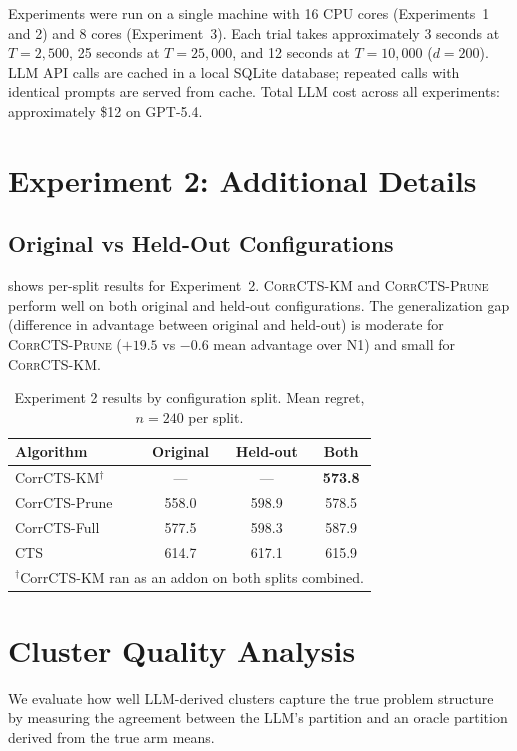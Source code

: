\documentclass{article}
\theoremstyle{plain}
\theoremstyle{definition}
\theoremstyle{remark}
\newcommand{\EdgePrune}{\textsc{CorrCTS-Prune}}
\newcommand{\KMRefine}{\textsc{CorrCTS-KM}}
\begin{document}
Experiments were run on a single machine with 16 CPU cores (Experiments~1 and 2) and 8 cores (Experiment~3).
Each trial takes approximately 3 seconds at $T = 2{,}500$, 25 seconds at $T = 25{,}000$, and 12 seconds at $T = 10{,}000$ ($d = 200$).
LLM API calls are cached in a local SQLite database; repeated calls with identical prompts are served from cache.
Total LLM cost across all experiments: approximately \$12 on GPT-5.4.

\section{Experiment 2: Additional Details}\label{app:tier7details}

\subsection{Original vs Held-Out Configurations}

 shows per-split results for Experiment~2.
\KMRefine{} and \EdgePrune{} perform well on both original and held-out configurations.
The generalization gap (difference in advantage between original and held-out) is moderate for \EdgePrune{} ($+19.5$ vs $-0.6$ mean advantage over N1) and small for \KMRefine{}.

\begin{table}[h]
\caption{Experiment 2 results by configuration split. Mean regret, $n = 240$ per split.}
\label{tab:tier7splits}
\centering
\small
\begin{tabular}{@{}lccc@{}}
\toprule
Algorithm & Original & Held-out & Both \\
\midrule
CorrCTS-KM$^\dagger$ & --- & --- & \textbf{573.8} \\
CorrCTS-Prune & 558.0 & 598.9 & 578.5 \\
CorrCTS-Full & 577.5 & 598.3 & 587.9 \\
CTS & 614.7 & 617.1 & 615.9 \\
\bottomrule
\multicolumn{4}{l}{\footnotesize $^\dagger$CorrCTS-KM ran as an addon on both splits combined.}
\end{tabular}
\end{table}

\section{Cluster Quality Analysis}\label{app:info}

We evaluate how well LLM-derived clusters capture the true problem structure by measuring the agreement between the LLM's partition and an oracle partition derived from the true arm means.
\end{document}

